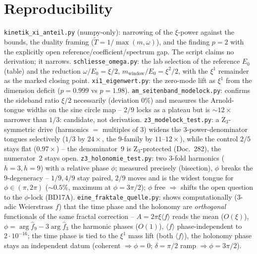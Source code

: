 \section{Reproducibility}\label{sec:repro-286}
\texttt{kinetik\_xi\_anteil.py} (numpy-only): narrowing of the $\xi$-power against the bounds, the
duality framing ($\tilde T=1/\max(m,\omega)$), and the finding $p=2$ with the explicitly open
reference/coefficient/spectrum gap. The script claims no derivation; it narrows. \texttt{schliesse\_omega.py}: the lab selection of the reference $E_0$ (table) and the reduction $\omega/E_0=\xi/2$, $m_{\text{window}}/E_0=\xi^2/2$, with the $\xi^1$ remainder as the marked closing point. \texttt{xi1\_eigenwert.py}: the zero-mode lift as $\xi^1$ from the dimension deficit ($p=0.999$ vs $p=1.98$). \texttt{am\_seitenband\_modelock.py}: confirms the sideband ratio $\xi/2$ necessarily (deviation $0\%$) and measures the Arnold-tongue widths on the sine circle map -- $2/9$ locks as a plateau but is $\sim\!12\times$ narrower than $1/3$: candidate, not derivation. \texttt{z3\_modelock\_test.py}: a Z$_3$-symmetric drive (harmonics $=$ multiples of $3$) widens the $3$-power-denominator tongues selectively ($1/3$ by $24\times$, the $9$-family by $11$--$12\times$), while the control $2/5$ stays flat ($0.97\times$) -- the denominator~$9$ is Z$_3$-protected (Doc.~282), the numerator~$2$ stays open. \texttt{z3\_holonomie\_test.py}: two $3$-fold harmonics ($h{=}3,h{=}9$) with a relative phase $\phi$; measured precisely (bisection), $\phi$ breaks the $9$-degeneracy -- $1/9,4/9$ stay paired, $2/9$ moves and is the widest tongue for $\phi\in(\pi,2\pi)$ ($\sim\!0.5\%$, maximum at $\phi=3\pi/2$); $\phi$ free $\Rightarrow$ shifts the open question to the $\phi$-lock (BD17A). \texttt{eine\_fraktale\_quelle.py}: shows computationally ($3$-adic Weierstrass $f$) that the time phase and the holonomy are \emph{orthogonal} functionals of the same fractal correction -- $A=2\pi\xi\langle f\rangle$ reads the mean ($O(\xi)$), $\phi=\arg\hat f_9-3\arg\hat f_3$ the harmonic phases ($O(1)$), $\langle f\rangle$ phase-independent to $2\cdot10^{-16}$; the time phase is tied to the $\xi^1$ mass lift (both $\langle f\rangle$), the holonomy phase stays an independent datum (coherent $\Rightarrow\phi=0$; $\delta=\pi/2$ ramp $\Rightarrow\phi=3\pi/2$).
